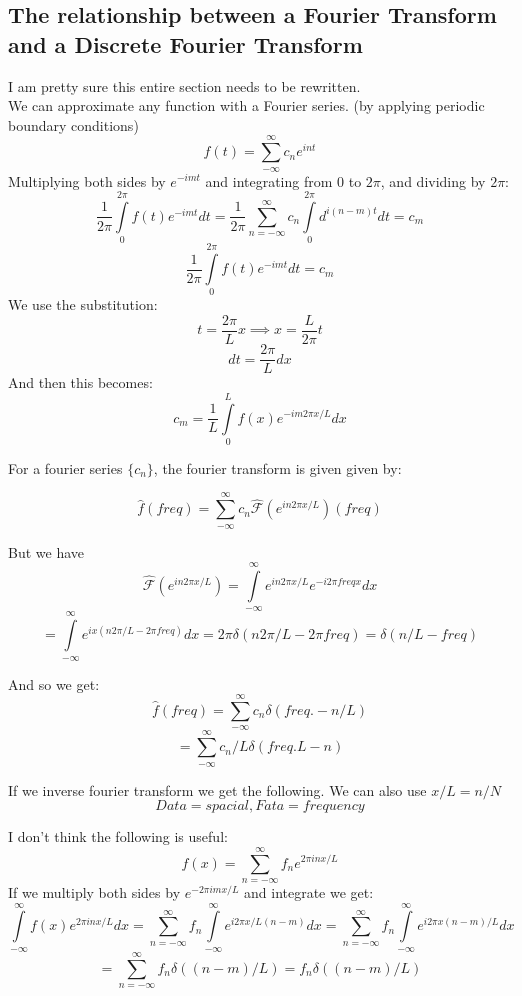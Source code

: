 \documentclass[a4paper,12pt]{report}
\begin{document}
\subsection{The relationship between a Fourier Transform and a Discrete Fourier Transform}
I am pretty sure this entire section needs to be rewritten.\\
We can approximate any function with a Fourier series. (by applying periodic boundary conditions)\\
$$f(t)=\sum\limits_{-\infty}^{\infty} c_n e^{i n t}$$
Multiplying both sides by $e^{-i m t}$ and integrating from 0 to $2\pi$, and dividing by $2\pi$:
$$\frac{1}{2\pi} \int\limits_{0}^{2\pi} f(t)e^{-i m t}dt = \frac{1}{2\pi} \sum \limits_{n=-\infty}^{\infty} c_n \int\limits_{0}^{2\pi} d^{i (n-m) t} dt= c_m$$
$$\frac{1}{2\pi} \int\limits_{0}^{2\pi} f(t)e^{-i m t}dt =c_m$$
We use the substitution:
$$t = \frac{2\pi}{L}  x \implies x = \frac{L}{2\pi} t$$
$$dt = \frac{2\pi}{L}  dx$$
And then this becomes:
$$c_m = \frac{1}{L} \int\limits_{0}^{L} f(x) e^{-i m 2\pi x/L} dx $$

For a fourier series $\{c_n\}$, the fourier transform is given given by:

$$\hat f (freq) = \sum\limits_{-\infty}^{\infty} c_n \mathscr{\hat F}(e^{i n 2 \pi x/L})(freq)$$ 

But we have $$\mathscr{\hat F}(e^{i n 2 \pi x/L}) = \int\limits_{-\infty}^\infty e^{i n 2 \pi x/L}e^{-i 2\pi freq x} dx $$
$$= \int\limits_{-\infty}^\infty e^{i x (n 2 \pi /L - 2\pi freq )}dx = 2\pi \delta (n 2\pi/L -2\pi freq)= \delta (n /L - freq)$$

And so we get:
$$\hat f (freq) = \sum\limits_{-\infty}^{\infty} c_n \delta(freq.- n/L)$$
$$= \sum\limits_{-\infty}^{\infty} c_n /L \delta(freq. L- n)$$

If we inverse fourier transform we get the following.
We can also use $x/L=n/N$
$$Data = spacial,  Fata=frequency$$


I don’t think the following is useful:
$$f(x)= \sum\limits_{n=-\infty}^\infty f_n e^{2\pi i n x/L} $$
If we multiply both sides by $e^{-2\pi i m x/L}$ and integrate we get:
$$\int \limits_{-\infty}^\infty f(x)e^{2\pi i n x/L} dx = \sum\limits_{n=-\infty}^\infty  f_n  \int \limits_{-\infty}^\infty  e^{i 2 \pi x/L (n-m)} dx  =  \sum\limits_{n=-\infty}^\infty  f_n  \int \limits_{-\infty}^\infty  e^{i 2 \pi x (n-m)/L} dx  $$
$$=  \sum\limits_{n=-\infty}^\infty  f_n \delta((n-m)/L) = f_n \delta((n-m)/L)$$
\end{document}
